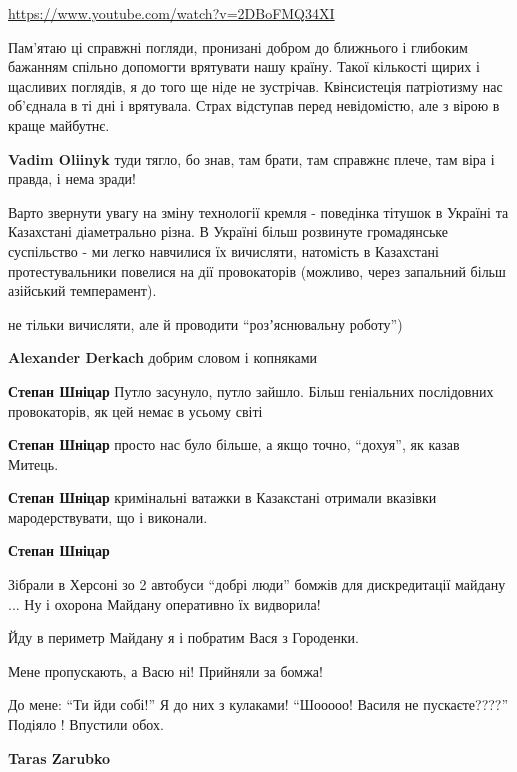 \begin{itemize}
\begin{itemize}
\url{https://www.youtube.com/watch?v=2DBoFMQ34XI}
\end{itemize} %


Пам’ятаю ці справжні погляди, пронизані добром до ближнього і глибоким бажанням
спільно допомогти врятувати нашу країну. Такої кількості щирих і щасливих
поглядів, я до того ще ніде не зустрічав. Квінсистеція патріотизму нас
об’єднала в ті дні і врятувала. Страх відступав перед невідомістю, але з вірою
в краще майбутнє.

\textbf{Vadim Oliinyk} туди тягло, бо знав, там брати, там справжнє плече, там віра і правда, і нема зради!


Варто звернути увагу на зміну технології кремля - поведінка тітушок в Україні
та Казахстані діаметрально різна. В Україні більш розвинуте громадянське
суспільство - ми легко навчилися їх вичисляти, натомість в Казахстані
протестувальники повелися на дії провокаторів (можливо, через запальний більш
азійський темперамент).

\begin{itemize} %
не тільки вичисляти, але й проводити \enquote{розʼяснювальну роботу})

\textbf{Alexander Derkach} добрим словом і копняками

\textbf{Степан Шніцар} Путло засунуло, путло зайшло. Більш геніальних послідовних провокаторів, як цей немає в усьому світі

\textbf{Степан Шніцар} просто нас було більше, а якщо точно, \enquote{дохуя}, як казав Митець.

\textbf{Степан Шніцар} кримінальні ватажки в Казакстані отримали вказівки мародерствувати, що і виконали.

\textbf{Степан Шніцар} 

Зібрали в Херсоні зо 2 автобуси \enquote{добрі люди} бомжів для дискредитації
майдану ... Ну і охорона Майдану оперативно їх видворила!

Йду в периметр Майдану я і побратим Вася з Городенки.

Мене пропускають, а Васю ні! Прийняли за бомжа!

До мене: \enquote{Ти йди собі!} Я до них з кулаками! \enquote{Шооооо! Василя не
пускаєте????} Подіяло ! Впустили обох.

\begin{itemize} %
\textbf{Taras Zarubko} 


\end{itemize}
\end{itemize}
\end{itemize}
